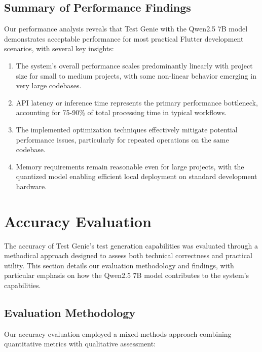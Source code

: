 \subsection{Summary of Performance Findings}

Our performance analysis reveals that Test Genie with the Qwen2.5 7B model demonstrates acceptable performance for most practical Flutter development scenarios, with several key insights:

\begin{enumerate}
    \item The system's overall performance scales predominantly linearly with project size for small to medium projects, with some non-linear behavior emerging in very large codebases.
    
    \item API latency or inference time represents the primary performance bottleneck, accounting for 75-90\% of total processing time in typical workflows.
    
    \item The implemented optimization techniques effectively mitigate potential performance issues, particularly for repeated operations on the same codebase.
    
    \item Memory requirements remain reasonable even for large projects, with the quantized model enabling efficient local deployment on standard development hardware.
\end{enumerate}

\section{Accuracy Evaluation}

The accuracy of Test Genie's test generation capabilities was evaluated through a methodical approach designed to assess both technical correctness and practical utility. This section details our evaluation methodology and findings, with particular emphasis on how the Qwen2.5 7B model contributes to the system's capabilities.

\subsection{Evaluation Methodology}

Our accuracy evaluation employed a mixed-methods approach combining quantitative metrics with qualitative assessment:

